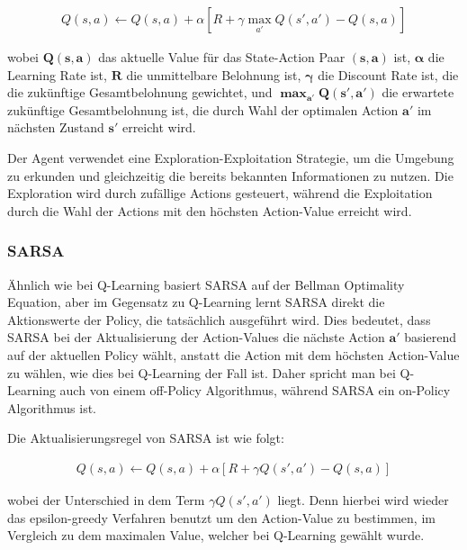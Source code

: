 \begin{align}
    Q(s,a) \leftarrow Q(s,a) + \alpha [R + \gamma \max_{a'} Q(s',a') - Q(s,a)]
\end{align}


wobei $\bm{Q(s,a)}$ das aktuelle Value für das State-Action Paar $\bm{(s,a)}$ ist, $\bm\alpha$ die Learning Rate ist, $\bm{R}$ die unmittelbare Belohnung ist, $\bm\gamma$ die Discount Rate ist, die die zukünftige Gesamtbelohnung gewichtet, und $\bm{\max_{a'} Q(s',a')}$ die erwartete zukünftige Gesamtbelohnung ist, die durch Wahl der optimalen Action $\bm{a'}$ im nächsten Zustand $\bm{s'}$ erreicht wird.

Der Agent verwendet eine Exploration-Exploitation Strategie, um die Umgebung zu erkunden und gleichzeitig die bereits bekannten Informationen zu nutzen. Die Exploration wird durch zufällige Actions gesteuert, während die Exploitation durch die Wahl der Actions mit den höchsten Action-Value erreicht wird.



\subsubsection{SARSA}

Ähnlich wie bei Q-Learning basiert SARSA auf der Bellman Optimality Equation, aber im Gegensatz zu Q-Learning lernt SARSA direkt die Aktionswerte der Policy, die tatsächlich ausgeführt wird. Dies bedeutet, dass SARSA bei der Aktualisierung der Action-Values die nächste Action $\bm{a'}$ basierend auf der aktuellen Policy wählt, anstatt die Action mit dem höchsten Action-Value zu wählen, wie dies bei Q-Learning der Fall ist.
Daher spricht man bei Q-Learning auch von einem off-Policy Algorithmus, während SARSA ein on-Policy Algorithmus ist. 

Die Aktualisierungsregel von SARSA ist wie folgt:

\begin{align}
    Q(s,a) \leftarrow Q(s,a) + \alpha [R + \gamma Q(s',a') - Q(s,a)]
\end{align}

wobei der Unterschied in dem Term $\gamma Q(s',a')$ liegt. Denn hierbei wird wieder das epsilon-greedy Verfahren benutzt um den Action-Value zu bestimmen, im Vergleich zu dem maximalen Value, welcher bei Q-Learning gewählt wurde.

